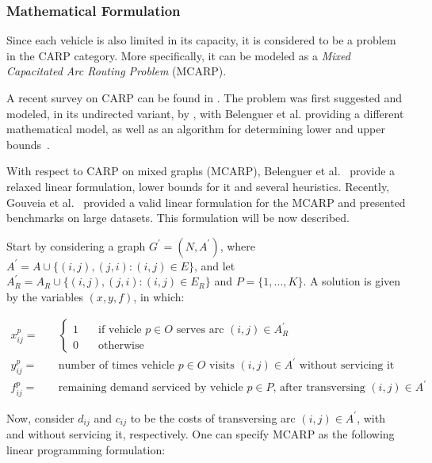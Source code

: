 \subsubsection{Mathematical Formulation}

Since each vehicle is also limited in its capacity, it is considered to be a
problem in the CARP category. More specifically, it can be modeled as a
\textit{Mixed Capacitated Arc Routing Problem} (MCARP).

A recent survey on CARP can be found in \citet{Wohlk08}. The problem was first
suggested and modeled, in its undirected variant, by \cite{Golden81}, with
Belenguer et al. providing a different mathematical model, as well as an
algorithm for determining lower and upper
bounds~\citep{Belenguer98,Belenguer03}.

With respect to CARP on mixed graphs (MCARP), Belenguer et
al.~\citep{Belenguer06} provide a relaxed linear formulation, lower bounds for
it and several heuristics. Recently, Gouveia et al.~\citep{Gouveia10} provided a
valid linear formulation for the MCARP and presented benchmarks on large
datasets. This formulation will be now described.

Start by considering a graph $G^\prime = (N, A^\prime)$, where $A^\prime = A
\cup \{(i,j),(j,i) : (i,j) \in E\}$, and let $A^{\prime}_R = A_R \cup
\{(i,j),(j,i) : (i,j) \in E_R\}$ and $P = \{1, ..., K\}$. A solution is given
by the variables $(x, y, f)$, in which:

\begin{align*}
x_{ij}^p = & \quad \left\{
	\begin{array}{ll}
		1 & \quad \mbox{if vehicle $p \in O$ serves arc $(i,j) \in A^{\prime}_R$} \\
		0 & \quad \mbox{otherwise}
	\end{array}
	\right. \\
y_{ij}^p = & \quad \mbox{number of times vehicle $p \in O$ visits $(i,j) \in A^{\prime}$ without servicing it} \\
f_{ij}^p = & \quad \mbox{remaining demand serviced by vehicle $p \in P$, after transversing $(i,j) \in A^\prime$}
\end{align*}

Now, consider $d_{ij}$ and $c_{ij}$ to be the costs of transversing arc $(i,j)
\in A^\prime$, with and without servicing it, respectively. One can specify
MCARP as the following linear programming formulation:

